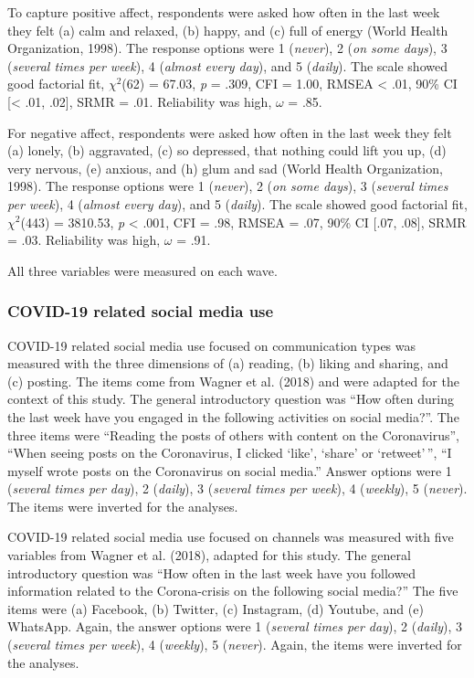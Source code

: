 \documentclass[
  man,mask,floatsintext]{apa7}
\begin{document}
To capture positive affect, respondents were asked how often in the last week they felt (a) calm and relaxed, (b) happy, and (c) full of energy (World Health Organization, 1998).
The response options were 1 (\emph{never}), 2 (\emph{on some days}), 3 (\emph{several times per week}), 4 (\emph{almost every day}), and 5 (\emph{daily}).
The scale showed good factorial fit, \(\chi^2\)(62) = 67.03, \emph{p} = .309, CFI = 1.00, RMSEA \textless{} .01, 90\% CI {[}\textless{} .01, .02{]}, SRMR = .01.
Reliability was high, \(\omega\) = .85.

For negative affect, respondents were asked how often in the last week they felt (a) lonely, (b) aggravated, (c) so depressed, that nothing could lift you up, (d) very nervous, (e) anxious, and (h) glum and sad (World Health Organization, 1998).
The response options were 1 (\emph{never}), 2 (\emph{on some days}), 3 (\emph{several times per week}), 4 (\emph{almost every day}), and 5 (\emph{daily}).
The scale showed good factorial fit, \(\chi^2\)(443) = 3810.53, \emph{p} \textless{} .001, CFI = .98, RMSEA = .07, 90\% CI {[}.07, .08{]}, SRMR = .03.
Reliability was high, \(\omega\) = .91.

All three variables were measured on each wave.

\hypertarget{covid-19-related-social-media-use}{%
\subsubsection{COVID-19 related social media use}\label{covid-19-related-social-media-use}}

COVID-19 related social media use focused on communication types was measured with the three dimensions of (a) reading, (b) liking and sharing, and (c) posting.
The items come from Wagner et al. (2018) and were adapted for the context of this study.
The general introductory question was ``How often during the last week have you engaged in the following activities on social media?''.
The three items were ``Reading the posts of others with content on the Coronavirus'', ``When seeing posts on the Coronavirus, I clicked `like', `share' or `retweet'\,'', ``I myself wrote posts on the Coronavirus on social media.''
Answer options were 1 (\emph{several times per day}), 2 (\emph{daily}), 3 (\emph{several times per week}), 4 (\emph{weekly}), 5 (\emph{never}).
The items were inverted for the analyses.

COVID-19 related social media use focused on channels was measured with five variables from Wagner et al. (2018), adapted for this study.
The general introductory question was ``How often in the last week have you followed information related to the Corona-crisis on the following social media?''
The five items were (a) Facebook, (b) Twitter, (c) Instagram, (d) Youtube, and (e) WhatsApp.
Again, the answer options were 1 (\emph{several times per day}), 2 (\emph{daily}), 3 (\emph{several times per week}), 4 (\emph{weekly}), 5 (\emph{never}).
Again, the items were inverted for the analyses.
\end{document}
